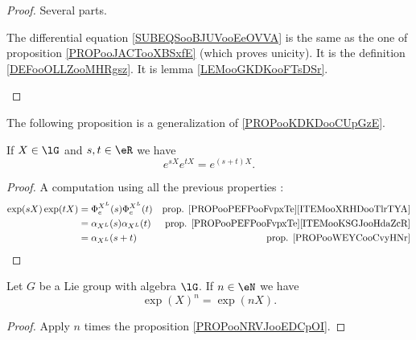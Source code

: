 \begin{proof}
	Several parts.
	\begin{subproof}
		The differential equation \eqref{SUBEQSooBJUVooEeOVVA} is the same as the one of proposition \ref{PROPooJACTooXBSxfE} (which proves unicity).
		It is the definition \ref{DEFooOLLZooMHRgsz}.
		It is lemma \ref{LEMooGKDKooFTsDSr}.
	\end{subproof}
\end{proof}


The following proposition is a generalization of \ref{PROPooKDKDooCUpGzE}.
\begin{proposition}     \label{PROPooNRVJooEDCpOI}
	If \( X\in \lG\) and \( s,t\in \eR\) we have
	\begin{equation}
		e^{sX} e^{tX}= e^{(s+t)X}.
	\end{equation}
\end{proposition}

\begin{proof}
	A computation using all the previous properties :
	\begin{subequations}
		\begin{align}
			\exp(sX)\exp(tX) & =\Phi_e^{X^L}(s)\Phi_e^{X^L}(t) & \text{prop. \ref{PROPooPEFPooFvpxTe}\ref{ITEMooXRHDooTlrTYA}} \\
			                 & =\alpha_{X^L}(s)\alpha_{X^L}(t) & \text{prop. \ref{PROPooPEFPooFvpxTe}\ref{ITEMooKSGJooHdaZcR}} \\
			                 & =\alpha_{X^L}(s+t)              & \text{prop. \ref{PROPooWEYCooCvyHNr}}
		\end{align}
	\end{subequations}
\end{proof}

\begin{lemma}       \label{LEMooRPHVooAtZJnz}
	Let \( G\) be a Lie group with algebra \( \lG\). If \( n\in \eN\) we have
	\begin{equation}
		\exp(X)^n=\exp(nX).
	\end{equation}
\end{lemma}

\begin{proof}
	Apply \( n\) times the proposition \ref{PROPooNRVJooEDCpOI}.
\end{proof}

